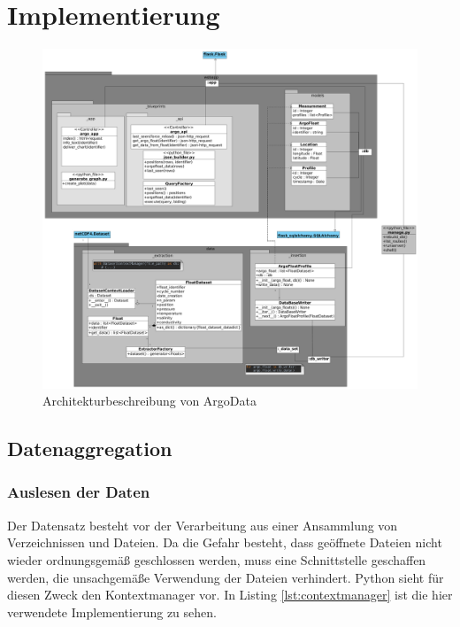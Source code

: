 \section{Implementierung}

\begin{figure}[h]
 \centering
 \includegraphics[width=\textwidth]{pix/Modulschema_komplett.png}
 \caption{Architekturbeschreibung von ArgoData}
 \label{fig:modulschema}
\end{figure}


\subsection{Datenaggregation}
 

\subsubsection{Auslesen der Daten}

Der Datensatz besteht vor der Verarbeitung aus einer Ansammlung von Verzeichnissen und Dateien. Da die Gefahr besteht, dass geöffnete Dateien nicht wieder ordnungsgemäß geschlossen werden, muss eine Schnittstelle geschaffen werden, die unsachgemäße Verwendung der Dateien verhindert. Python sieht für diesen Zweck den Kontextmanager vor. In Listing \ref{lst:contextmanager} ist die hier verwendete Implementierung zu sehen.
\pagebreak
{}
    
